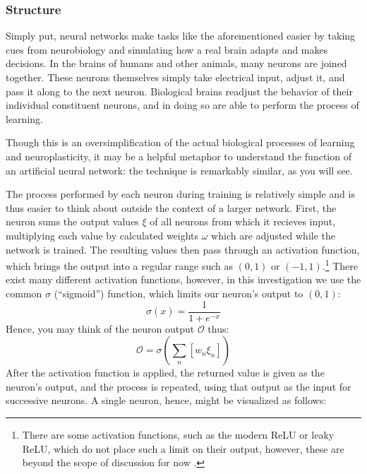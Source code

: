 \documentclass{article}
\begin{document}
\subsubsection{Structure}
Simply put, neural networks make tasks like the aforementioned easier by taking cues from neurobiology and simulating how a real brain adapts and makes decisions. In the brains of humans and other animals, many neurons are joined together. These neurons themselves simply take electrical input, adjust it, and pass it along to the next neuron. Biological brains readjust the behavior of their individual constituent neurons, and in doing so are able to perform the process of learning.

Though this is an oversimplification of the actual biological processes of learning and neuroplasticity, it may be a helpful metaphor to understand the function of an artificial neural network: the technique is remarkably similar, as you will see.

The process performed by each neuron during training is relatively simple and is thus easier to think about outside the context of a larger network. First, the neuron sums the output values $\xi$ of all neurons from which it recieves input, multiplying each value by calculated weights $\omega$ which are adjusted while the network is trained. The resulting values then pass through an activation function, which brings the output into a regular range such as $(0, 1)$ or $(-1, 1)$.\footnote{There are some activation functions, such as the modern ReLU or leaky ReLU, which do not place such a limit on their output, however, these are beyond the scope of discussion for now \cite{activationfunctions}.} There exist many different activation functions, however, in this investigation we use the common $\sigma$ (``sigmoid'') function, which limits our neuron's output to $(0, 1)$:
$$\sigma(x)=\frac{1}{1+e^{-x}}$$
Hence, you may think of the neuron output $\mathcal{O}$ thus:
$$\mathcal{O}=\sigma(\sum_n[w_{n}\xi_{n}])$$
After the activation function is applied, the returned value is given as the neuron's output, and the process is repeated, using that output as the input for successive neurons. A single neuron, hence, might be visualized as follows:
\end{document}
